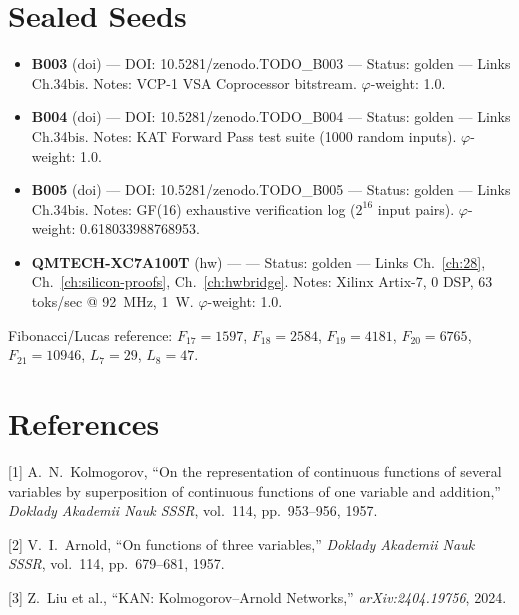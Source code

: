 \section{Sealed Seeds}
\label{sec:hwbridge:sealed}

\begin{itemize}
\tightlist
\item
  \textbf{B003} (doi) --- DOI: 10.5281/zenodo.TODO\_B003 --- Status: golden ---
  Links Ch.34bis. Notes: VCP-1 VSA Coprocessor bitstream. $\varphi$-weight: 1.0.
\item
  \textbf{B004} (doi) --- DOI: 10.5281/zenodo.TODO\_B004 --- Status: golden ---
  Links Ch.34bis. Notes: KAT Forward Pass test suite (1000 random inputs).
  $\varphi$-weight: 1.0.
\item
  \textbf{B005} (doi) --- DOI: 10.5281/zenodo.TODO\_B005 --- Status: golden ---
  Links Ch.34bis. Notes: GF(16) exhaustive verification log ($2^{16}$ input pairs).
  $\varphi$-weight: 0.618033988768953.
\item
  \textbf{QMTECH-XC7A100T} (hw) ---
   --- Status:
  golden --- Links Ch.~\ref{ch:28}, Ch.~\ref{ch:silicon-proofs}, Ch.~\ref{ch:hwbridge}.
  Notes: Xilinx Artix-7, 0 DSP, 63 toks/sec @ 92~MHz, 1~W.
  $\varphi$-weight: 1.0.
\end{itemize}

Fibonacci/Lucas reference: $F_{17}=1597$, $F_{18}=2584$,
$F_{19}=4181$, $F_{20}=6765$, $F_{21}=10946$, $L_7=29$, $L_8=47$.

\section{References}
\label{sec:hwbridge:references}

[1] A.~N.~Kolmogorov, ``On the representation of continuous functions of
several variables by superposition of continuous functions of one variable
and addition,'' \textit{Doklady Akademii Nauk SSSR}, vol.~114, pp.~953--956, 1957.

[2] V.~I.~Arnold, ``On functions of three variables,'' \textit{Doklady
Akademii Nauk SSSR}, vol.~114, pp.~679--681, 1957.

[3] Z.~Liu et al., ``KAN: Kolmogorov--Arnold Networks,''
\textit{arXiv:2404.19756}, 2024.

